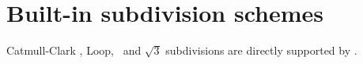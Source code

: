 





\section{Built-in subdivision schemes}
Catmull-Clark , Loop, \DS\ and $\sqrt{3}$ subdivisions are directly supported 
by . 

